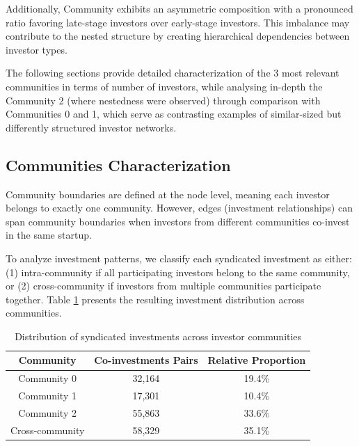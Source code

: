 Additionally, Community \interestingCommunity{} exhibits an asymmetric composition with a pronounced ratio favoring late-stage investors over early-stage investors. This imbalance may contribute to the nested structure by creating hierarchical dependencies between investor types.


The following sections provide detailed characterization of the 3 most relevant communities in terms of number of investors, while analysing in-depth the Community 2 (where nestedness were observed) through comparison with Communities 0 and 1, which serve as contrasting examples of similar-sized but differently structured investor networks.

\subsection{Communities Characterization}

Community boundaries are defined at the node level, meaning each investor belongs to exactly one community. However, edges (investment relationships) can span community boundaries when investors from different communities co-invest in the same startup.

To analyze investment patterns, we classify each syndicated investment as either: (1) intra-community if all participating investors belong to the same community, or (2) cross-community if investors from multiple communities participate together. Table \ref{tab:investment_distribution} presents the resulting investment distribution across communities.

\begin{table}[htbp]
\centering
\begin{tabular}{|c|c|c|}
\hline
\textbf{Community} & \textbf{Co-investments Pairs} & \textbf{Relative Proportion} \\
\hline
Community 0 & 32,164 & 19.4\% \\
Community 1 & 17,301 & 10.4\% \\
Community 2 & 55,863 & 33.6\% \\
Cross-community & 58,329 & 35.1\% \\
\hline
\end{tabular}
\caption{Distribution of syndicated investments across investor communities}
\label{tab:investment_distribution}
\end{table}

